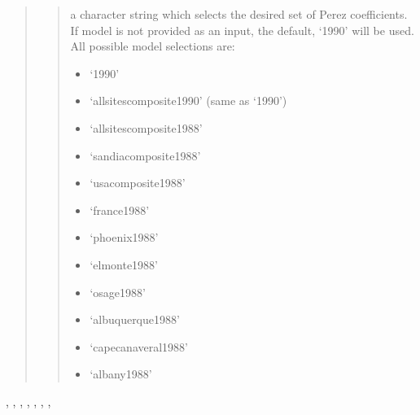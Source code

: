 \documentclass[letterpaper,10pt,english]{sphinxmanual}
\begin{document}
\begin{fulllineitems}
\begin{quote}
\begin{description}
\begin{quote}
a character string which selects the desired set of Perez
coefficients. If model is not provided as an input, the default,
`1990' will be used.
All possible model selections are:
\begin{itemize}
\item {} 
`1990'

\item {} 
`allsitescomposite1990' (same as `1990')

\item {} 
`allsitescomposite1988'

\item {} 
`sandiacomposite1988'

\item {} 
`usacomposite1988'

\item {} 
`france1988'

\item {} 
`phoenix1988'

\item {} 
`elmonte1988'

\item {} 
`osage1988'

\item {} 
`albuquerque1988'

\item {} 
`capecanaveral1988'

\item {} 
`albany1988'

\end{itemize}
\end{quote}

\end{description}\end{quote}




{\hyperref[stubs/pvlib.pvl_ephemeris:pvlib.pvl_ephemeris]{}}, {\hyperref[stubs/pvlib.pvl_extraradiation:pvlib.pvl_extraradiation]{}}, {\hyperref[stubs/pvlib.pvl_isotropicsky:pvlib.pvl_isotropicsky]{}}, {\hyperref[stubs/pvlib.pvl_haydavies1980:pvlib.pvl_haydavies1980]{}}, {\hyperref[stubs/pvlib.pvl_reindl1990:pvlib.pvl_reindl1990]{}}, {\hyperref[stubs/pvlib.pvl_klucher1979:pvlib.pvl_klucher1979]{}}, {\hyperref[stubs/pvlib.pvl_kingdiffuse:pvlib.pvl_kingdiffuse]{}}, {\hyperref[stubs/pvlib.pvl_relativeairmass:pvlib.pvl_relativeairmass]{}}



\end{fulllineitems}
\end{document}
